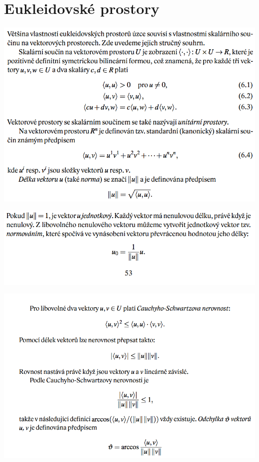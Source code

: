 \documentclass[12pt,a4paper]{article}
\begin{document}
\section{Eukleidovské prostory}
\begin{center}
	\includegraphics[scale=0.5]{img/EukleidovskeProstory1}
\end{center}
\begin{center}
	\includegraphics[scale=0.5]{img/EukleidovskeProstory2}
\end{center}
\begin{center}
	\includegraphics[scale=0.5]{img/EukleidovskeProstory3}
\end{center}
\end{document}
